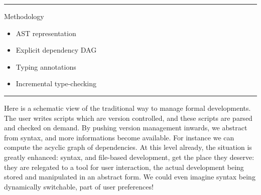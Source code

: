 \documentclass[12pt]{article} \usepackage{beamerarticle} \usepackage{fullpage}
\begin{document}
\hrule
\begin{frame}{Methodology}
  \begin{center}
  \end{center}
  \begin{itemize}
  \item<4-> AST representation
  \item<5-> Explicit dependency DAG
  \item<7-> Typing annotations
  \item<8-> Incremental type-checking
  \end{itemize}
\end{frame}
\hrule

Here is a schematic view of the traditional way to manage formal
developments. The user writes scripts which are version controlled,
and these scripts are parsed and checked on demand. By pushing version
management inwards, we abstract from syntax, and more informations
become available. For instance we can compute the acyclic graph of
dependencies. At this level already, the situation is greatly
enhanced: syntax, and file-based development, get the place they
deserve: they are relegated to a tool for user interaction, the actual
development being stored and manipulated in an abstract form. We could
even imagine syntax being dynamically switchable, part of user
preferences!
\end{document}
